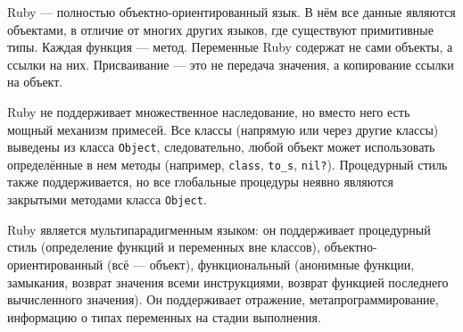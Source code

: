 \documentclass[a4paper,14pt]{extarticle}
\begin{document}
Ruby — полностью объектно-ориентированный язык. В нём все данные являются
объектами, в отличие от многих других языков, где существуют примитивные типы.
Каждая функция — метод. Переменные Ruby содержат не сами объекты, а ссылки на
них. Присваивание — это не передача значения, а копирование ссылки на
объект\cite{ruby}.

Ruby не поддерживает множественное наследование, но вместо него есть мощный
механизм примесей. Все классы (напрямую или через другие классы) выведены из
класса \texttt{Object}, следовательно, любой объект может использовать
определённые в нем методы (например, \texttt{class}, \texttt{to\_s},
\texttt{nil?}). Процедурный стиль также поддерживается, но все глобальные
процедуры неявно являются закрытыми методами класса \texttt{Object}.

Ruby является мультипарадигменным языком: он поддерживает процедурный стиль
(определение функций и переменных вне классов), объектно-ориентированный
(всё — объект), функциональный (анонимные функции, замыкания, возврат значения
всеми инструкциями, возврат функцией последнего вычисленного значения).
Он поддерживает отражение, метапрограммирование, информацию о типах переменных
на стадии выполнения.
\end{document}
